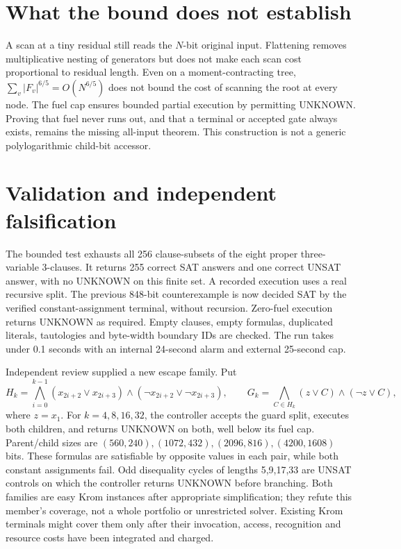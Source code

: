 \documentclass[11pt]{article}
\begin{document}
\section{What the bound does not establish}
A scan at a tiny residual still reads the $N$-bit original input. Flattening
removes multiplicative nesting of generators but does not make each scan
cost proportional to residual length. Even on a moment-contracting tree,
$\sum_v |F_v|^{6/5}=O(N^{6/5})$ does not bound the cost of scanning the root
at every node. The fuel cap ensures bounded partial execution by permitting
UNKNOWN. Proving that fuel never runs out, and that a terminal or accepted
gate always exists, remains the missing all-input theorem. This construction
is not a generic polylogarithmic child-bit accessor.

\section{Validation and independent falsification}
The bounded test exhausts all 256 clause-subsets of the eight proper three-variable
3-clauses. It returns 255 correct SAT answers and one correct UNSAT answer,
with no UNKNOWN on this finite set. A recorded execution uses a real recursive
split. The previous 848-bit counterexample is now decided SAT by the verified
constant-assignment terminal, without recursion. Zero-fuel execution returns
UNKNOWN as required. Empty clauses, empty formulas, duplicated literals,
tautologies and byte-width boundary IDs are checked. The run takes under
0.1 seconds with an internal 24-second alarm and external 25-second cap.

Independent review supplied a new escape family. Put
\[
 H_k=\bigwedge_{i=0}^{k-1}(x_{2i+2}\vee x_{2i+3})
 \wedge(\neg x_{2i+2}\vee\neg x_{2i+3}),\qquad
 G_k=\bigwedge_{C\in H_k}(z\vee C)\wedge(\neg z\vee C),
\]
where $z=x_1$. For $k=4,8,16,32$, the controller accepts the guard split,
executes both children, and returns UNKNOWN on both, well below its fuel cap.
Parent/child sizes are $(560,240),(1072,432),(2096,816),(4200,1608)$ bits.
These formulas are satisfiable by opposite values in each pair, while both
constant assignments fail. Odd disequality cycles of lengths 5,9,17,33 are
UNSAT controls on which the controller returns UNKNOWN before branching.
Both families are easy Krom instances after appropriate simplification;
they refute this member's coverage, not a whole portfolio or unrestricted
solver. Existing Krom terminals might cover them only after their invocation,
access, recognition and resource costs have been integrated and charged.
\end{document}
